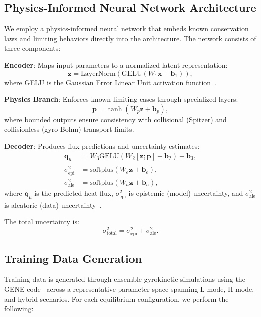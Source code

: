 \documentclass[12pt]{article}
\begin{document}
\subsection{Physics-Informed Neural Network Architecture}

We employ a physics-informed neural network that embeds known conservation laws and limiting behaviors directly into the architecture. The network consists of three components:

\textbf{Encoder}: Maps input parameters to a normalized latent representation:
\begin{equation}
\mathbf{z} = \text{LayerNorm}(\text{GELU}(W_1 \mathbf{x} + \mathbf{b}_1)),
\end{equation}
where GELU is the Gaussian Error Linear Unit activation function~\cite{hendrycks2016}.

\textbf{Physics Branch}: Enforces known limiting cases through specialized layers:
\begin{equation}
\mathbf{p} = \tanh(W_p \mathbf{z} + \mathbf{b}_p),
\end{equation}
where bounded outputs ensure consistency with collisional (Spitzer) and collisionless (gyro-Bohm) transport limits.

\textbf{Decoder}: Produces flux predictions and uncertainty estimates:
\begin{align}
\mathbf{q}_\mu &= W_3 \text{GELU}(W_2 [\mathbf{z}; \mathbf{p}] + \mathbf{b}_2) + \mathbf{b}_3, \\
\sigma_{\text{epi}}^2 &= \text{softplus}(W_e \mathbf{z} + \mathbf{b}_e), \\
\sigma_{\text{ale}}^2 &= \text{softplus}(W_a \mathbf{z} + \mathbf{b}_a),
\end{align}
where $\mathbf{q}_\mu$ is the predicted heat flux, $\sigma_{\text{epi}}^2$ is epistemic (model) uncertainty, and $\sigma_{\text{ale}}^2$ is aleatoric (data) uncertainty~\cite{kendall2017}.

The total uncertainty is:
\begin{equation}
\sigma_{\text{total}}^2 = \sigma_{\text{epi}}^2 + \sigma_{\text{ale}}^2.
\end{equation}

\subsection{Training Data Generation}

Training data is generated through ensemble gyrokinetic simulations using the GENE code~\cite{jenko2000} across a representative parameter space spanning L-mode, H-mode, and hybrid scenarios. For each equilibrium configuration, we perform the following:
\end{document}
